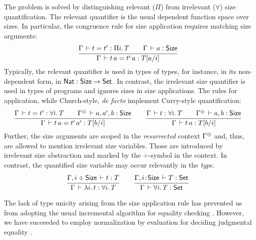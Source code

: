 \documentclass[a4paper]{easychair}
\begin{document}
The problem is solved by distinguishing relevant ($\Pi$) from irrelevant
($\forall$) size quantification.  The relevant quantifier is the usual
dependent function space over sizes.  In particular, the congruence
rule for size application requires matching size arguments:
\[
  \ru{\Gamma \der t = t' : \Pi i.\, T \qquad
      \Gamma \der a : \Size
    }{\Gamma \der t\,a = t'\,a : T[a/i]}
\]
Typically, the relevant quantifier is used in types of types, for
instance, in its non-dependent form, in $\Nat : \aSize \to \Set$.
In contrast, the irrelevant size quantifier is used in types of
programs and ignores sizes in size applications.  The rules for
application, while Church-style, \textit{de facto} implement Curry-style
quantification:
\[
  \ru{\Gamma \der t = t' : \forall i.\, T \qquad
      \resurrect\Gamma \der a,a',b : \Size
    }{\Gamma \der t\,a = t'\,a' : T[b/i]}
\qquad
  \ru{\Gamma \der t : \forall i.\, T \qquad
      \resurrect\Gamma \der a,b : \Size
    }{\Gamma \der t\,a : T[b/i]}
\]
Further, the size arguments are scoped in the \emph{resurrected}
\cite{pfenning:lics01} context
$\resurrect \Gamma$ and, thus, are allowed to mention irrelevant size
variables.  Those are introduced by irrelevant size abstraction and
marked by the $\div$-symbol in the context.
In contrast, the quantified size variable may occur relevantly in the
\emph{type}.
\[
  \ru{\Gamma, i \erof \Size \der t : T
    }{\Gamma \der \lambda i.\, t : \forall i.\, T}
\qquad
  \ru{\Gamma, i \of \Size \der T : \Set
    }{\Gamma \der \forall i.\, T : \Set}
\]

The lack of type unicity arising from the size application rule has
prevented us from adopting the usual incremental algorithm for
equality checking
\cite{harperPfenning:equivalenceLF,abelScherer:types10}.
However, we have succeeded to employ normalization by evaluation
\cite{abelCoquandDybjer:lics07}
for deciding judgmental equality \cite{abelVezzosiWinterhalter:icfp17}.


\end{document}
